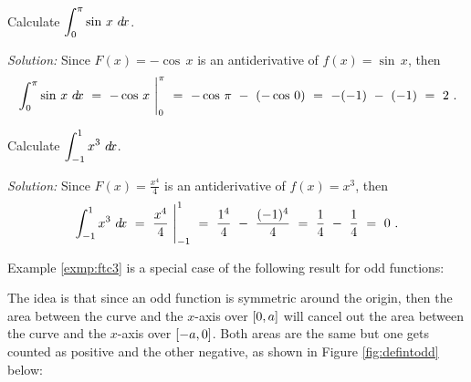 \begin{exmp}\label{exmp:ftc2}
\noindent Calculate $\displaystyle\int_0^{\pi} \sin\,x~d\!x$.\vspace{1mm}
\par\noindent\emph{Solution:} Since $F(x) = -\cos\,x$ is an antiderivative of
$f(x) = \sin\,x$, then
\[
\int_0^{\pi} \sin\,x~d\!x ~=~ -\cos\,x~\Biggr|_0^{\pi} ~=~ -\cos\,\pi ~-~ (-\cos\,0)
 ~=~ -(-1) ~-~ (-1) ~=~ 2 ~.
\]
\end{exmp}
\divider
\newpage
\begin{exmp}\label{exmp:ftc3}
\noindent Calculate $\displaystyle\int_{-1}^{1} x^3~d\!x$.\vspace{1mm}
\par\noindent\emph{Solution:} Since $F(x) = \frac{x^4}{4}$ is an antiderivative of
$f(x) = x^3$, then
\[
\int_{-1}^{1} x^3~d\!x ~=~ \frac{x^4}{4}~\Biggr|_{-1}^{1} ~=~ \frac{1^4}{4} ~-~
 \frac{(-1)^4}{4} ~=~ \frac{1}{4} ~-~ \frac{1}{4} ~=~ 0~.
\]
\end{exmp}
\divider
\vspace{3mm}

Example \ref{exmp:ftc3} is a special case of the following result for odd
functions:


The idea is that since an odd function is symmetric around the origin, then the
area between the curve and the $x$-axis over $\lbrack 0,a \rbrack$ will cancel out the
area between the curve and the $x$-axis over $\lbrack -a,0 \rbrack$. Both areas are the
same but one gets counted as positive and the other negative, as shown in
Figure \ref{fig:defintodd} below:

